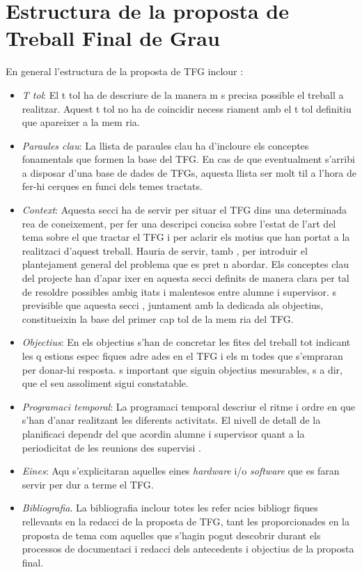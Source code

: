 \section{Estructura de la proposta de Treball Final de Grau}
En general l'estructura de la proposta de \ac{TFG} inclour :
\begin{itemize}
\item \emph{T tol}: El t tol ha de descriure de la manera m s precisa possible el treball a realitzar. Aquest t tol no ha de coincidir necess riament amb el t tol definitiu que apareixer  a la mem ria.
\item \emph{Paraules clau}: La llista de paraules clau ha d'incloure els conceptes fonamentals que formen la base del \ac{TFG}. En cas de que eventualment s'arribi a disposar d'una base de dades de \ac{TFG}s, aquesta llista ser  molt  til a l'hora de fer-hi cerques en funci  dels temes tractats.
\item \emph{Context}: Aquesta secci  ha de servir per situar el \ac{TFG} dins una determinada  rea de coneixement, per fer una descripci  concisa sobre l'estat de l'art del tema sobre el que tractar  el \ac{TFG} i per aclarir els motius que han portat a la realitzaci  d'aquest treball. Hauria de servir, tamb , per introduir el plantejament general del problema que es pret n abordar. Els conceptes clau del projecte han d'apar ixer en aquesta secci  definits de manera clara per tal de resoldre possibles ambig itats i malentesos entre alumne i supervisor.  s previsible que aquesta secci , juntament amb la dedicada als objectius, constitueixin la base del primer cap tol de la mem ria del \ac{TFG}.
\item \emph{Objectius}: En els objectius s'han de concretar les fites del treball tot indicant les q estions espec fiques adre ades en el \ac{TFG} i els m todes que s'empraran per donar-hi resposta.  s important que siguin objectius mesurables,  s a dir, que el seu assoliment sigui constatable.
\item \emph{Programaci  temporal}: La programaci  temporal descriur  el ritme i ordre en que s'han d'anar realitzant les diferents activitats. El nivell de detall de la planificaci  dependr  del que acordin alumne i supervisor quant a la periodicitat de les reunions des supervisi .
\item \emph{Eines}: Aqu  s'explicitaran aquelles eines \emph{hardware} i/o \emph{software} que es faran servir per dur a terme el \ac{TFG}.
\item \emph{Bibliografia}. La bibliografia inclour  totes les refer ncies bibliogr fiques rellevants en la redacci  de la proposta de \ac{TFG}, tant les proporcionades en la proposta de tema com aquelles que s'hagin pogut descobrir durant els processos de documentaci  i redacci  dels antecedents i objectius de la proposta final.
\end{itemize}
